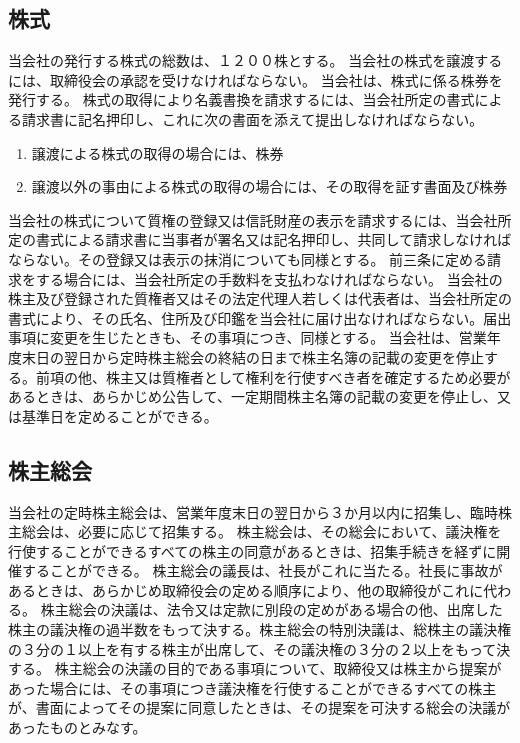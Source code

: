 \documentclass[10pt,a4paper,uplatex]{jsarticle}
\begin{document}
\subsection{株式}
当会社の発行する株式の総数は、１２００株とする。
当会社の株式を譲渡するには、取締役会の承認を受けなければならない。
当会社は、株式に係る株券を発行する。
株式の取得により名義書換を請求するには、当会社所定の書式による請求書に記名押印し、これに次の書面を添えて提出しなければならない。
\begin{enumerate}
  \item 譲渡による株式の取得の場合には、株券
  \item 譲渡以外の事由による株式の取得の場合には、その取得を証す書面及び株券
\end{enumerate}
当会社の株式について質権の登録又は信託財産の表示を請求するには、当会社所定の書式による請求書に当事者が署名又は記名押印し、共同して請求しなければならない。その登録又は表示の抹消についても同様とする。
前三条に定める請求をする場合には、当会社所定の手数料を支払わなければならない。
当会社の株主及び登録された質権者又はその法定代理人若しくは代表者は、当会社所定の書式により、その氏名、住所及び印鑑を当会社に届け出なければならない。届出事項に変更を生じたときも、その事項につき、同様とする。
当会社は、営業年度末日の翌日から定時株主総会の終結の日まで株主名簿の記載の変更を停止する。前項の他、株主又は質権者として権利を行使すべき者を確定するため必要があるときは、あらかじめ公告して、一定期間株主名簿の記載の変更を停止し、又は基準日を定めることができる。

\subsection{株主総会}
当会社の定時株主総会は、営業年度末日の翌日から３か月以内に招集し、臨時株主総会は、必要に応じて招集する。
株主総会は、その総会において、議決権を行使することができるすべての株主の同意があるときは、招集手続きを経ずに開催することができる。
株主総会の議長は、社長がこれに当たる。社長に事故があるときは、あらかじめ取締役会の定める順序により、他の取締役がこれに代わる。
株主総会の決議は、法令又は定款に別段の定めがある場合の他、出席した株主の議決権の過半数をもって決する。株主総会の特別決議は、総株主の議決権の３分の１以上を有する株主が出席して、その議決権の３分の２以上をもって決する。
株主総会の決議の目的である事項について、取締役又は株主から提案があった場合には、その事項につき議決権を行使することができるすべての株主が、書面によってその提案に同意したときは、その提案を可決する総会の決議があったものとみなす。
\end{document}
